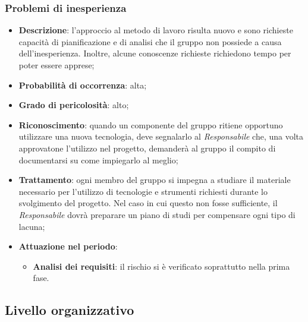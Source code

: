 		\subsubsection{Problemi di inesperienza}
		\begin{itemize}
			\item \textbf{Descrizione}: l'approccio al metodo di lavoro risulta nuovo e sono richieste capacità di pianificazione e di analisi che il gruppo non possiede a causa dell'inesperienza. Inoltre, alcune conoscenze richieste richiedono tempo per poter essere apprese;
			\item \textbf{Probabilità di occorrenza}: alta;
			\item \textbf{Grado di pericolosità}: alto;
			\item \textbf{Riconoscimento}: quando un componente del gruppo ritiene opportuno utilizzare una nuova tecnologia, deve segnalarlo al \emph{Responsabile} che, una volta approvatone l'utilizzo nel progetto, demanderà al gruppo il compito di documentarsi su come 	impiegarlo al meglio;
			\item \textbf{Trattamento}: ogni membro del gruppo si impegna a studiare il materiale necessario per l'utilizzo di tecnologie e strumenti richiesti durante lo svolgimento del progetto. Nel caso in cui questo non fosse sufficiente, il \emph{Responsabile} dovrà preparare un piano di studi per compensare ogni tipo di lacuna;
			\item \textbf{Attuazione nel periodo}:
			\begin{itemize}
				\item \textbf{Analisi dei requisiti}:  il rischio si è verificato soprattutto nella prima fase.
			\end{itemize}
		\end{itemize}
	\subsection{Livello organizzativo}
